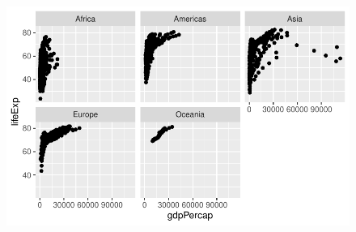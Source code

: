 \documentclass[
  letterpaper,
  DIV=11,
  numbers=noendperiod]{scrartcl}
\begin{document}
\begin{figure}[H]

{\centering \includegraphics{./-class05_files/figure-pdf/unnamed-chunk-27-1.pdf}

}

\end{figure}
\end{document}
